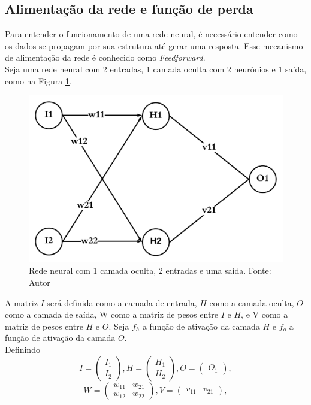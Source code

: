 \documentclass[a4paper,12pt]{article}
\begin{document}
\subsection{Alimentação da rede e função de perda}
Para entender o funcionamento de uma rede neural, é necessário entender como os dados se propagam por sua estrutura até gerar uma resposta. Esse mecanismo de alimentação da rede é conhecido como \textit{Feedforward}.\\ 
Seja uma rede neural com 2 entradas, 1 camada oculta com 2 neurônios e 1 saída, como na Figura \ref{2-2-1}.

\begin{figure}[H]
\centering 
\includegraphics[scale=0.3]{Figuras/2-2-1.png}
\caption{Rede neural com 1 camada oculta, 2 entradas e uma saída. Fonte: Autor} 
\label{2-2-1}
\end{figure} 

A matriz $I$ será definida como a camada de entrada, $H$ como a camada oculta, $O$ como a camada de saída, W como a matriz de pesos entre $I$ e $H$, e V como a matriz de pesos entre $H$ e $O$. Seja $f_{h}$ a função de ativação da camada $H$ e $f_{o}$ a função de ativação da camada $O$.\\

Definindo
$$
    I = \begin{pmatrix}I_1\\I_2\end{pmatrix}, H = \begin{pmatrix}H_1\\H_2\end{pmatrix}, O = \begin{pmatrix}O_1\end{pmatrix},
$$
$$
    W = \begin{pmatrix}w_{11}&w_{21}\\w_{12}&w_{22}\end{pmatrix}, V = \begin{pmatrix}v_{11}&v_{21}\end{pmatrix},
$$
\end{document}
